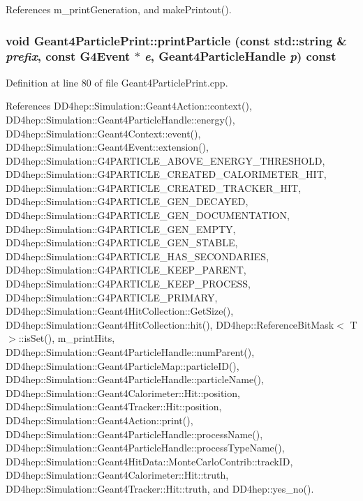 References m\_\-printGeneration, and makePrintout().\hypertarget{class_d_d4hep_1_1_simulation_1_1_geant4_particle_print_a863c1f3d373bd9f588ce2eb2e54cc289}{
\subsubsection[{printParticle}]{\setlength{\rightskip}{0pt plus 5cm}void Geant4ParticlePrint::printParticle (const std::string \& {\em prefix}, \/  const G4Event $\ast$ {\em e}, \/  {\bf Geant4ParticleHandle} {\em p}) const}}
\label{class_d_d4hep_1_1_simulation_1_1_geant4_particle_print_a863c1f3d373bd9f588ce2eb2e54cc289}


Definition at line 80 of file Geant4ParticlePrint.cpp.

References DD4hep::Simulation::Geant4Action::context(), DD4hep::Simulation::Geant4ParticleHandle::energy(), DD4hep::Simulation::Geant4Context::event(), DD4hep::Simulation::Geant4Event::extension(), DD4hep::Simulation::G4PARTICLE\_\-ABOVE\_\-ENERGY\_\-THRESHOLD, DD4hep::Simulation::G4PARTICLE\_\-CREATED\_\-CALORIMETER\_\-HIT, DD4hep::Simulation::G4PARTICLE\_\-CREATED\_\-TRACKER\_\-HIT, DD4hep::Simulation::G4PARTICLE\_\-GEN\_\-DECAYED, DD4hep::Simulation::G4PARTICLE\_\-GEN\_\-DOCUMENTATION, DD4hep::Simulation::G4PARTICLE\_\-GEN\_\-EMPTY, DD4hep::Simulation::G4PARTICLE\_\-GEN\_\-STABLE, DD4hep::Simulation::G4PARTICLE\_\-HAS\_\-SECONDARIES, DD4hep::Simulation::G4PARTICLE\_\-KEEP\_\-PARENT, DD4hep::Simulation::G4PARTICLE\_\-KEEP\_\-PROCESS, DD4hep::Simulation::G4PARTICLE\_\-PRIMARY, DD4hep::Simulation::Geant4HitCollection::GetSize(), DD4hep::Simulation::Geant4HitCollection::hit(), DD4hep::ReferenceBitMask$<$ T $>$::isSet(), m\_\-printHits, DD4hep::Simulation::Geant4ParticleHandle::numParent(), DD4hep::Simulation::Geant4ParticleMap::particleID(), DD4hep::Simulation::Geant4ParticleHandle::particleName(), DD4hep::Simulation::Geant4Calorimeter::Hit::position, DD4hep::Simulation::Geant4Tracker::Hit::position, DD4hep::Simulation::Geant4Action::print(), DD4hep::Simulation::Geant4ParticleHandle::processName(), DD4hep::Simulation::Geant4ParticleHandle::processTypeName(), DD4hep::Simulation::Geant4HitData::MonteCarloContrib::trackID, DD4hep::Simulation::Geant4Calorimeter::Hit::truth, DD4hep::Simulation::Geant4Tracker::Hit::truth, and DD4hep::yes\_\-no().

